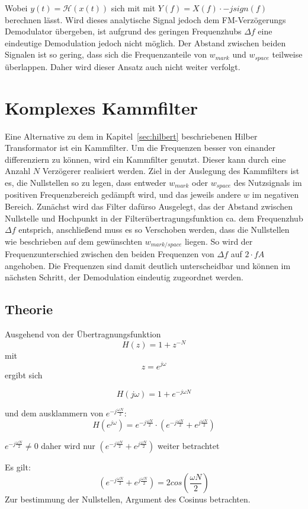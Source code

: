 \documentclass{article}
\begin{document}
Wobei $y(t) = \mathcal{H}(x(t))$ sich mit mit $Y(f) = X(f) \cdot -j sign(f)$ berechnen lässt.
Wird dieses analytische Signal jedoch dem FM-Verzögerungs Demodulator übergeben, ist aufgrund des 
geringen Frequenzhubs $\varDelta f$ eine eindeutige Demodulation jedoch nicht möglich. Der Abstand zwischen beiden Signalen ist so gering, dass sich die 
Frequenzanteile von $w_{mark}$ und $w_{space}$ teilweise überlappen. Daher wird
dieser Ansatz auch nicht weiter verfolgt.


\section{Komplexes Kammfilter}\label{sec:comb}
Eine Alternative zu dem in Kapitel~\ref{sec:hilbert} beschriebenen Hilber Transformator ist ein Kammfilter.
Um die Frequenzen besser von einander differenziern zu können, wird ein Kammfilter genutzt. Dieser kann durch eine Anzahl $N$ Verzögerer realisiert werden.
Ziel in der Auslegung des Kammfilters ist es, die Nullstellen so zu legen, dass entweder $w_{mark}$ oder $w_{space}$ des Nutzsignals im positiven Frequenzbereich
gedämpft wird, und das jeweils andere $w$ im negativen Bereich. Zunächst wird das Filter dafürso Ausgelegt, das der Abstand zwischen
Nullstelle und Hochpunkt in der Filterübertragungsfunktion ca. dem Frequenzhub $\varDelta f$ entsprich, anschließend muss es so Verschoben werden, dass die Nullstellen wie beschrieben auf dem
gewünschten $w_{mark/space}$ liegen.
So wird der Frequenzunterschied zwischen den beiden Frequenzen von $\varDelta f$ auf $2\cdot fA$ angehoben.
Die Frequenzen sind damit deutlich unterscheidbar und können im nächsten Schritt, der Demodulation eindeutig zugeordnet werden. 

\subsection{Theorie}


Ausgehend von der Übertragnungsfunktion 
$$H(z) = 1 + z^{-N}$$ 
mit 
$$ z = e^{j\omega} $$
ergibt sich

$$H(j\omega) = 1 + e^{-j\omega N}$$

und dem ausklammern von $ e^{-j \frac{\omega N}{2}}$:
$$
H(e^{j\omega}) = e^{-j \frac{\omega N}{2}} \cdot (e^{-j \frac{\omega N}{2}} + e^{j \frac{\omega N}{2}})
$$

$e^{-j \frac{\omega N}{2}} \neq 0$ daher wird nur $(e^{-j \frac{\omega N}{2}} + e^{j \frac{\omega N}{2}})$ weiter betrachtet

Es gilt:
$$
(e^{-j \frac{\omega N}{2}} + e^{j \frac{\omega N}{2}}) = 2  cos(\frac{\omega N}{2})
$$
Zur bestimmung der Nullstellen, Argument des Cosinus betrachten.
\end{document}

